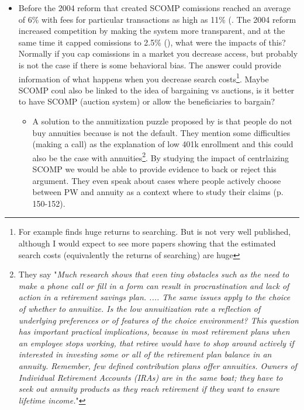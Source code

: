 \documentclass[12pt]{article}
\theoremstyle{plain}
\theoremstyle{plain}
\begin{document}
\begin{itemize}
    \item Before the 2004 reform that created SCOMP comissions reached an average of 6\% with fees for particular transactions as high as 11\% (\cite[p. 390]{morales_chilean_2017}. The 2004 reform increased competition by making the system more transparent, and at the same time it capped comissions to 2.5\% (\cite[p. 391]{morales_chilean_2017}), what were the impacts of this? Normally if you cap comissions in a market you decrease access, but probably is not the case if there is some behavioral bias. The answer could provide information of what happens when you decrease search costs\footnote{For example \textcite{cannon_price_2015} finds huge returns to searching. But is not very well published, although I would expect to see more papers showing that the estimated search costs (equivalently the returns of searching) are huge }.  Maybe SCOMP coul also be linked to the idea of bargaining vs auctions, is it better to have SCOMP (auction system) or allow the beneficiaries to bargain? 

    \begin{itemize}
        \item A solution to the annuitization puzzle proposed by \textcite{benartzi_annuitization_2011} is that people do not buy annuities because is not the default. They mention some difficulties (making a call) as the explanation of low 401k enrollment and this could also be the case with annuities\footnote{They say "\textit{Much research shows that even tiny obstacles such as the need to make a phone call or fill in a form can result in  procrastination and lack of action in a retirement savings plan. .... 
        The same issues apply to the choice of whether to annuitize. Is the low annuitization rate a reflection of underlying preferences or of features of the choice environment? This question has important practical implications, because in most retirement plans when an employee stops working, that retiree would have to shop  around actively if interested in investing some or all of the retirement plan balance in an annuity. Remember, few defined contribution plans offer annuities.  Owners of Individual Retirement Accounts (IRAs) are in the same boat; they have to seek out  annuity products as they reach retirement if they want to ensure lifetime income.}"}. By studying the impact of centrlaizing SCOMP we would be able to provide evidence to back or reject this argument. They even speak about cases where people actively choose between PW and annuity as a context where to study their claims (p. 150-152). 
    \end{itemize}


\end{itemize}
\end{document}
